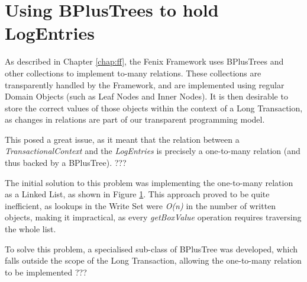 \section{Using BPlusTrees to hold LogEntries}

As described in Chapter \ref{chap:ff}, the Fenix Framework uses
BPlusTrees and other collections to implement to-many relations. These
collections are transparently handled by the Framework, and are
implemented using regular Domain Objects (such as Leaf Nodes and Inner
Nodes). It is then desirable to store the correct values of those
objects within the context of a Long Transaction, as changes in
relations are part of our transparent programming model.

This posed a great issue, as it meant that the relation between a {\it
  TransactionalContext} and the {\it LogEntries} is precisely a
one-to-many relation (and thus backed by a BPlusTree). ???

The initial solution to this problem was implementing the one-to-many
relation as a Linked List, as shown in Figure
\ref{fig:linkedList}. This approach proved to be quite inefficient, as
lookups in the Write Set were {\it O(n)} in the number of written
objects, making it impractical, as every {\it getBoxValue} operation
requires traversing the whole list.

\begin{figure}
  \centering

\caption{}
\label{fig:linkedList}
\end{figure}

To solve this problem, a specialised sub-class of BPlusTree was
developed, which falls outside the scope of the Long Transaction,
allowing the one-to-many relation to be implemented ???

